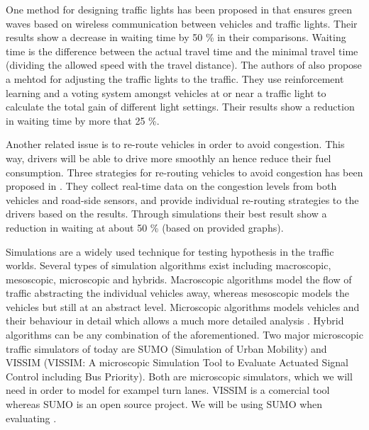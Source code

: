 One method for designing traffic lights has been proposed in \cite{SOTL} that ensures green waves based on wireless communication between vehicles and traffic lights. 
Their results show a decrease in waiting time by 50 \% in their comparisons. 
Waiting time is the difference between the actual travel time and the minimal travel time (dividing the allowed speed with the travel distance).
The authors of \cite{ITLC} also propose a mehtod for adjusting the traffic lights to the traffic. 
They use reinforcement learning and a voting system amongst vehicles at or near a traffic light to calculate the total gain of different light settings. 
Their results show a reduction in waiting time by more that 25 \%.

Another related issue is to re-route vehicles in order to avoid congestion. 
This way, drivers will be able to drive more smoothly an hence reduce their fuel consumption. 
Three strategies for re-routing vehicles to avoid congestion has been proposed in \cite{congestionAvoidance}. 
They collect real-time data on the congestion levels from both vehicles and road-side sensors, and provide individual re-routing strategies to the drivers based on the results. 
Through simulations their best result show a reduction in waiting at about 50 \% (based on provided graphs). %

Simulations are a widely used technique for testing hypothesis in the traffic worlds.
Several types of simulation algorithms exist including macroscopic, mesoscopic, microscopic and hybrids.
Macroscopic algorithms model the flow of traffic abstracting the individual vehicles away, whereas mesoscopic models the vehicles but still at an abstract level. 
Microscopic algorithms models vehicles and their behaviour in detail which allows a much more detailed analysis \cite{meso-micro}. 
Hybrid algorithms can be any combination of the aforementioned.
Two major microscopic traffic simulators of today are SUMO (Simulation of Urban Mobility)\cite{sumo} and VISSIM (VISSIM: A microscopic Simulation Tool to Evaluate Actuated Signal Control including Bus Priority)\cite{vissim}.
Both are microscopic simulators, which we will need in order to model for exampel turn lanes.
VISSIM is a comercial tool whereas SUMO is an open source project.
We will be using SUMO when evaluating \tech.







